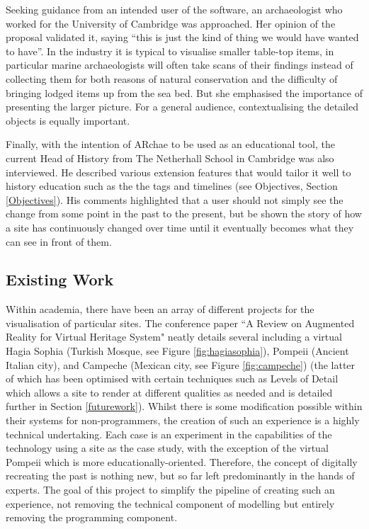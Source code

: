 \documentclass[12pt, a4paper]{article}
\begin{document}
Seeking guidance from an intended user of the software, an archaeologist who worked for the University of Cambridge was approached. Her opinion of the proposal validated it, saying ``this is just the kind of thing we would have wanted to have''. In the industry it is typical to visualise smaller table-top items, in particular marine archaeologists will often take scans of their findings instead of collecting them for both reasons of natural conservation and the difficulty of bringing lodged items up from the sea bed. But she emphasised the importance of presenting the larger picture. For a general audience, contextualising the detailed objects is equally important. 

Finally, with the intention of ARchae to be used as an educational tool, the current Head of History from The Netherhall School in Cambridge was also interviewed. He described various extension features that would tailor it well to history education such as the the tags and timelines (see Objectives, Section \ref{Objectives}). His comments highlighted that a user should not simply see the change from some point in the past to the present, but be shown the story of how a site has continuously changed over time until it eventually becomes what they can see in front of them.

\subsection{Existing Work}
\label{existingwork}
Within academia, there have been an array of different projects for the visualisation of particular sites. The conference paper ``A Review on Augmented Reality for Virtual Heritage System" \cite{existing:virtualhertitagereview} neatly details several including a virtual Hagia Sophia \cite{existing:hagia} (Turkish Mosque, see Figure \ref{fig:hagiasophia}), Pompeii \cite{existing:pompeii} (Ancient Italian city), and Campeche 
\cite{existing:campeche} (Mexican city, see Figure \ref{fig:campeche}) (the latter of which has been optimised with certain techniques such as Levels of Detail which allows a site to render at different qualities as needed and is detailed further in Section \ref{futurework}). Whilst there is some modification possible within their systems for non-programmers, the creation of such an experience is a highly technical undertaking. Each case is an experiment in the capabilities of the technology using a site as the case study, with the exception of the virtual Pompeii which is more educationally-oriented. Therefore, the concept of digitally recreating the past is nothing new, but so far left predominantly in the hands of experts. The goal of this project to simplify the pipeline of creating such an experience, not removing the technical component of modelling but entirely removing the programming component.
\end{document}
